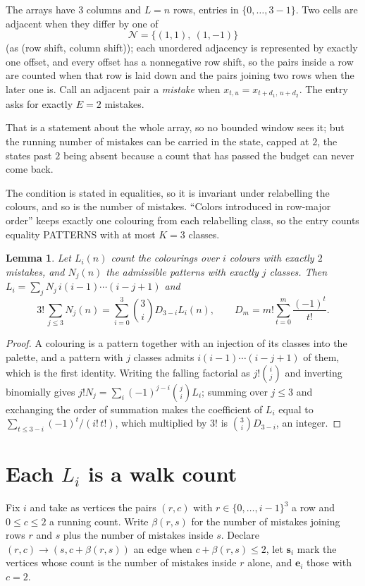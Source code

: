 \documentclass[11pt,a4paper]{article}
\theoremstyle{plain}
\newtheorem{lemma}[theorem]{Lemma}
\theoremstyle{definition}
\begin{document}
The arrays have $3$ columns and $L=n$ rows, entries in $\{0,\dots,3-1\}$.
Two cells are adjacent when they differ by one of
\[
\mathcal N=\{(1,1),\ (1,-1)\}
\]
(as (row shift, column shift)); each unordered adjacency is represented by exactly one
offset, and every offset has a nonnegative row shift, so the pairs inside a row are
counted when that row is laid down and the pairs joining two rows when the later one
is. Call an adjacent pair a \emph{mistake} when $x_{t,u}=x_{t+d_1,\,u+d_2}$. The entry asks for exactly
$E=2$ mistakes.

That is a statement about the whole array, so no bounded window sees it; but the running
number of mistakes can be carried in the state, capped at $2$, the states past $2$ being
absent because a count that has passed the budget can never come back.

The condition is stated in equalities, so it is invariant under relabelling the colours, and
so is the number of mistakes. ``Colors introduced in row-major order'' keeps exactly one
colouring from each relabelling class, so the entry counts equality PATTERNS with at most
$K=3$ classes.

\begin{lemma}\label{lem:inv}
Let $L_i(n)$ count the colourings over $i$ colours with exactly $2$ mistakes, and $N_j(n)$
the admissible patterns with exactly $j$ classes. Then
$L_i=\sum_j N_j\,i(i-1)\cdots(i-j+1)$ and
\[
3!\,\sum_{j\le3}N_j(n)=\sum_{i=0}^{3}\binom{3}{i}D_{3-i}L_i(n),
\qquad D_m=m!\sum_{t=0}^{m}\frac{(-1)^t}{t!} .
\]
\end{lemma}

\begin{proof}
A colouring is a pattern together with an injection of its classes into the palette, and a
pattern with $j$ classes admits $i(i-1)\cdots(i-j+1)$ of them, which is the first identity.
Writing the falling factorial as $j!\binom{i}{j}$ and inverting binomially gives
$j!N_j=\sum_i(-1)^{j-i}\binom{j}{i}L_i$; summing over $j\le3$ and exchanging the order
of summation makes the coefficient of $L_i$ equal to $\sum_{t\le3-i}(-1)^t/(i!\,t!)$,
which multiplied by $3!$ is $\binom{3}{i}D_{3-i}$, an integer.
\end{proof}

\section{Each $L_i$ is a walk count}

Fix $i$ and take as vertices the pairs $(r,c)$ with $r\in\{0,\dots,i-1\}^{3}$ a row
and $0\le c\le2$ a running count. Write $\beta(r,s)$ for the number of mistakes joining
rows $r$ and $s$ plus the number of mistakes inside $s$. Declare $(r,c)\to(s,c+\beta(r,s))$
an edge when $c+\beta(r,s)\le2$, let $\mathbf{s}_i$ mark the vertices whose count is the
number of mistakes inside $r$ alone, and $\mathbf{e}_i$ those with $c=2$.
\end{document}
